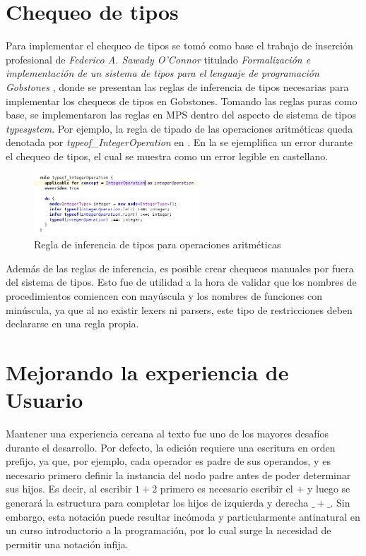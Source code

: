 \section{Chequeo de tipos}\label{chequeo}

Para implementar el chequeo de tipos se tomó como base el trabajo de inserción profesional de \textit{Federico A. Sawady O’Connor} titulado \textit{Formalización e implementación de un sistema de tipos para el lenguaje de programación Gobstones} \cite{TiposGobstones}, donde se presentan las reglas de inferencia de tipos necesarias para implementar los chequeos de tipos en Gobstones. 
Tomando las reglas puras como base, se implementaron las reglas en MPS dentro del aspecto de sistema de tipos \textit{typesystem}. Por ejemplo, la regla de tipado de las operaciones aritméticas queda denotada por \textit{typeof\_IntegerOperation} en .
En la  se ejemplifica un error durante el chequeo de tipos, el cual se muestra como un error legible en castellano.

  \begin{figure}
  \centering
  \includegraphics[width=0.55\textwidth]{assets/rule_operation}
  \caption{Regla de inferencia de tipos para operaciones aritméticas}
  \label{fig:rule_operation}
  \end{figure}
  

Además de las reglas de inferencia, es posible crear chequeos manuales por fuera del sistema de tipos. Esto fue de utilidad a la hora de validar que los nombres de procedimientos comiencen con mayúscula y los nombres de funciones con minúscula, ya que al no existir lexers ni parsers, este tipo de restricciones deben declararse en una regla propia.

\section{Mejorando la experiencia de Usuario}\label{usabilidad}

Mantener una experiencia cercana al texto fue uno de los mayores desafíos durante el desarrollo. Por defecto, la edición requiere una escritura en orden prefijo, ya que, por ejemplo, cada operador es padre de sus operandos, y es necesario primero definir la instancia del nodo padre antes de poder determinar sus hijos.
Es decir, al escribir $1+2$ primero es necesario escribir el $+$ y luego se generará la estructura para completar los hijos de izquierda y derecha $\_ + \_$. Sin embargo, esta notación puede resultar incómoda y particularmente antinatural en un curso introductorio a la programación, por lo cual surge la necesidad de permitir una notación infija.

